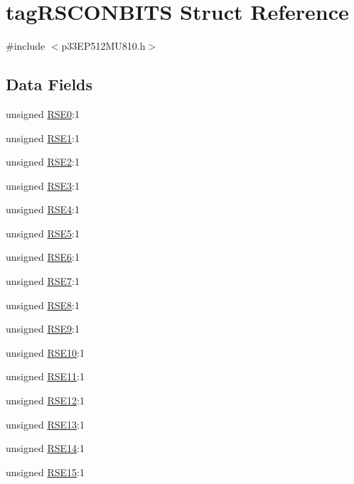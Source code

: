 \hypertarget{structtag_r_s_c_o_n_b_i_t_s}{}\section{tag\+R\+S\+C\+O\+N\+B\+I\+TS Struct Reference}
\label{structtag_r_s_c_o_n_b_i_t_s}


{\ttfamily \#include $<$p33\+E\+P512\+M\+U810.\+h$>$}

\subsection*{Data Fields}
\begin{DoxyCompactItemize}
\item 
unsigned \hyperlink{structtag_r_s_c_o_n_b_i_t_s_a0725b79c6fe866487f6560080b0d7595}{R\+S\+E0}\+:1
\item 
unsigned \hyperlink{structtag_r_s_c_o_n_b_i_t_s_a1548d28d04a79d83e2c590582201c02a}{R\+S\+E1}\+:1
\item 
unsigned \hyperlink{structtag_r_s_c_o_n_b_i_t_s_aa67e3966ccca634caf05971615a0f09d}{R\+S\+E2}\+:1
\item 
unsigned \hyperlink{structtag_r_s_c_o_n_b_i_t_s_a86c29ebf64227f0876b9ec8065fa664e}{R\+S\+E3}\+:1
\item 
unsigned \hyperlink{structtag_r_s_c_o_n_b_i_t_s_aaf0997ebb381a55176b6964f507fb250}{R\+S\+E4}\+:1
\item 
unsigned \hyperlink{structtag_r_s_c_o_n_b_i_t_s_a43da068d4911c2575b7fde4d000bc6f3}{R\+S\+E5}\+:1
\item 
unsigned \hyperlink{structtag_r_s_c_o_n_b_i_t_s_a884f617b1b94de8bde51760c477b47c2}{R\+S\+E6}\+:1
\item 
unsigned \hyperlink{structtag_r_s_c_o_n_b_i_t_s_afaed761465a9f605ff15574a9aecaed2}{R\+S\+E7}\+:1
\item 
unsigned \hyperlink{structtag_r_s_c_o_n_b_i_t_s_ad04770efbf0c445b4ad789e4d783d278}{R\+S\+E8}\+:1
\item 
unsigned \hyperlink{structtag_r_s_c_o_n_b_i_t_s_a13ca701f9cfc374a4490c7c9e5c55f41}{R\+S\+E9}\+:1
\item 
unsigned \hyperlink{structtag_r_s_c_o_n_b_i_t_s_aa9f9476309bf34915fe6383368f0c1f0}{R\+S\+E10}\+:1
\item 
unsigned \hyperlink{structtag_r_s_c_o_n_b_i_t_s_ae412fabb5244f88718cf9550d309e045}{R\+S\+E11}\+:1
\item 
unsigned \hyperlink{structtag_r_s_c_o_n_b_i_t_s_a07999546d3164e503553afe8834002b3}{R\+S\+E12}\+:1
\item 
unsigned \hyperlink{structtag_r_s_c_o_n_b_i_t_s_a5f9f62c466d1c2b1acfa6971e2903ec7}{R\+S\+E13}\+:1
\item 
unsigned \hyperlink{structtag_r_s_c_o_n_b_i_t_s_ad7b0b9fcf8b26acb30febf40c057ca02}{R\+S\+E14}\+:1
\item 
unsigned \hyperlink{structtag_r_s_c_o_n_b_i_t_s_a647b40bd988554474c8dc589f7c90547}{R\+S\+E15}\+:1
\end{DoxyCompactItemize}


